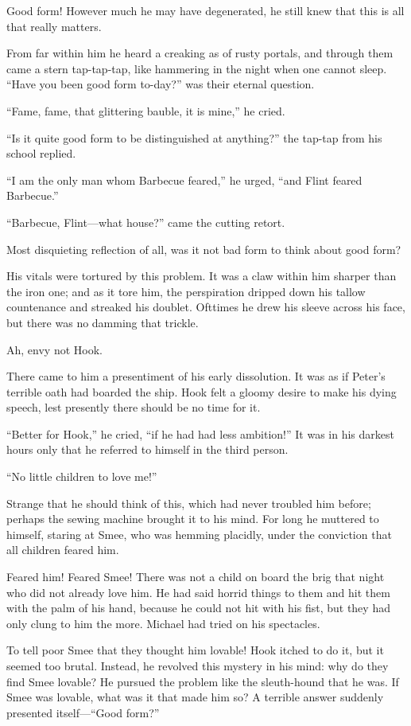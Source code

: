 Good form! However much he may have degenerated, he still knew that
this is all that really matters.

From far within him he heard a creaking as of rusty portals, and
through them came a stern tap-tap-tap, like hammering in the night when
one cannot sleep. ``Have you been good form to-day?'' was their eternal
question.

``Fame, fame, that glittering bauble, it is mine,'' he cried.

``Is it quite good form to be distinguished at anything?'' the tap-tap
from his school replied.

``I am the only man whom Barbecue feared,'' he urged, ``and Flint feared
Barbecue.''

``Barbecue, Flint—what house?'' came the cutting retort.

Most disquieting reflection of all, was it not bad form to think about
good form?

His vitals were tortured by this problem. It was a claw within him
sharper than the iron one; and as it tore him, the perspiration dripped
down his tallow countenance and streaked his doublet. Ofttimes he drew
his sleeve across his face, but there was no damming that trickle.

Ah, envy not Hook.

There came to him a presentiment of his early dissolution. It was as if
Peter's terrible oath had boarded the ship. Hook felt a gloomy desire
to make his dying speech, lest presently there should be no time for
it.

``Better for Hook,'' he cried, ``if he had had less ambition!'' It was in
his darkest hours only that he referred to himself in the third person.

``No little children to love me!''

Strange that he should think of this, which had never troubled him
before; perhaps the sewing machine brought it to his mind. For long he
muttered to himself, staring at Smee, who was hemming placidly, under
the conviction that all children feared him.

Feared him! Feared Smee! There was not a child on board the brig that
night who did not already love him. He had said horrid things to them
and hit them with the palm of his hand, because he could not hit with
his fist, but they had only clung to him the more. Michael had tried on
his spectacles.

To tell poor Smee that they thought him lovable! Hook itched to do it,
but it seemed too brutal. Instead, he revolved this mystery in his
mind: why do they find Smee lovable? He pursued the problem like the
sleuth-hound that he was. If Smee was lovable, what was it that made
him so? A terrible answer suddenly presented itself—``Good form?''

